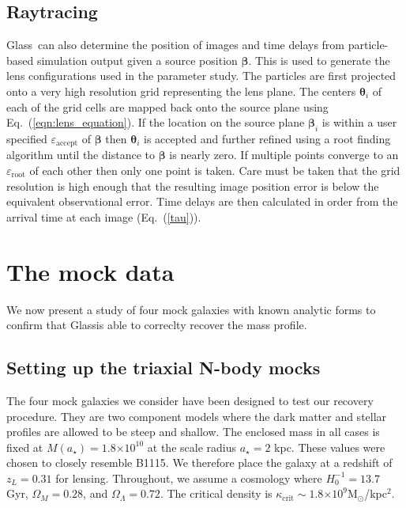 \documentclass[galley,usenatbib]{mn2e}
\newcommand{\Glass}{{\sc Glass}}
\newcommand{\eps}{\ensuremath{\varepsilon}}
\newcommand{\Msun}{\ensuremath{\mathrm{M}_\odot}}
\newcommand{\eqnref}[1] {Eq.~(\ref{#1})}
\newcommand{\e}[1]{\ensuremath{\times 10^{#1}}}
\renewcommand{\vec}[1]{\ensuremath{\boldsymbol{#1}}}
\begin{document}
\subsection{Raytracing}
\label{Raytracing}
\Glass\ can also determine the position of images and time delays from 
particle-based simulation output given a source position $\vec\beta$. This is
used to generate the lens configurations used in the parameter study.  The
particles are first projected onto a very high resolution grid representing the
lens plane. The centers $\vec\theta_i$ of each of the grid cells are mapped
back onto the source plane using \eqnref{eqn:lens_equation}. If the location on
the source plane $\vec\beta_i$ is within a user specified
$\eps_\mathrm{accept}$ of $\vec\beta$ then $\vec\theta_i$ is 
accepted and further refined using a root finding algorithm until the distance
to $\vec\beta$ is nearly zero. If multiple points converge to an
$\eps_\mathrm{root}$ of each other then only one point is taken.  Care must be
taken that the grid resolution is high enough that the resulting image position
error is below the equivalent observational error. Time delays are then
calculated in order from the arrival time at each image (\eqnref{tau}).

\section{The mock data}\label{sec:mockdata}

We now present a study of four mock galaxies with known analytic forms to
confirm that \Glass is able to correclty recover the mass profile.

\subsection{Setting up the triaxial N-body mocks}

The four mock galaxies we consider have been designed to test our recovery
procedure. They are two component models where the dark matter and stellar
profiles are allowed to be steep and shallow.  The enclosed mass in all cases
is fixed at $M(a_\star)= 1.8\e{10}$ at the scale radius $a_\star=2$ kpc. These
values were chosen to closely resemble B1115. We therefore place the galaxy at
a redshift of $z_L = 0.31$ for lensing.  Throughout, we assume a cosmology
where $H_0^{-1}=13.7$ Gyr, $\Omega_M=0.28$, and $\Omega_\Lambda=0.72$. The
critical density is $\kappa_\mathrm{crit}\sim 1.8\e{9}$\Msun/kpc$^2$.
\end{document}
